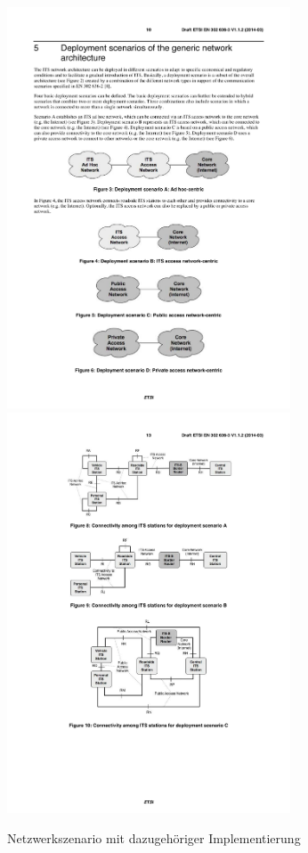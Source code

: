 \begin{figure}
	\includegraphics[width=0.75\textwidth]{content/images/02_architektur/netzwerkSzenario.pdf}
	\includegraphics[width=0.75\textwidth]{content/images/02_architektur/verbindungenNetzwerkSzenario.pdf}
	\caption{Netzwerkszenario mit dazugehöriger Implementierung \cite{etsi302636-3}}
	\label{fig:architektur_netzwerkSzenario}
\end{figure}

